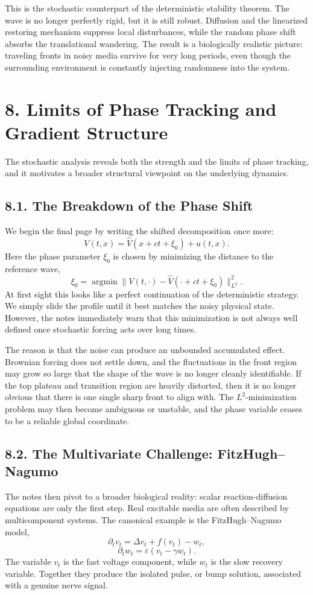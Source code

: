 \documentclass[11pt]{article}
\theoremstyle{definition}
\theoremstyle{remark}
\begin{document}
This is the stochastic counterpart of the deterministic stability theorem. The wave is no longer perfectly rigid, but it is still robust. Diffusion and the linearized restoring mechanism suppress local disturbances, while the random phase shift absorbs the translational wandering. The result is a biologically realistic picture: traveling fronts in noisy media survive for very long periods, even though the surrounding environment is constantly injecting randomness into the system.

\section*{8. Limits of Phase Tracking and Gradient Structure}
The stochastic analysis reveals both the strength and the limits of phase tracking, and it motivates a broader structural viewpoint on the underlying dynamics.

\subsection*{8.1. The Breakdown of the Phase Shift}
We begin the final page by writing the shifted decomposition once more:
\[
V(t,x)=\widehat V(x+ct+\xi_0)+u(t,x).
\]
Here the phase parameter \(\xi_0\) is chosen by minimizing the distance to the reference wave,
\[
\xi_0=\operatorname*{argmin}\|V(t,\cdot)-\widehat V(\cdot+ct+\xi_0)\|_{L^2}^2.
\]
At first sight this looks like a perfect continuation of the deterministic strategy. We simply slide the profile until it best matches the noisy physical state. However, the notes immediately warn that this minimization is not always well defined once stochastic forcing acts over long times.

The reason is that the noise can produce an unbounded accumulated effect. Brownian forcing does not settle down, and the fluctuations in the front region may grow so large that the shape of the wave is no longer cleanly identifiable. If the top plateau and transition region are heavily distorted, then it is no longer obvious that there is one single sharp front to align with. The \(L^2\)-minimization problem may then become ambiguous or unstable, and the phase variable ceases to be a reliable global coordinate.

\subsection*{8.2. The Multivariate Challenge: FitzHugh--Nagumo}
The notes then pivot to a broader biological reality: scalar reaction-diffusion equations are only the first step. Real excitable media are often described by multicomponent systems. The canonical example is the FitzHugh--Nagumo model,
\[
\partial_t v_t=\Delta v_t+f(v_t)-w_t,
\]
\[
\partial_t w_t=\varepsilon(v_t-\gamma w_t).
\]
The variable \(v_t\) is the fast voltage component, while \(w_t\) is the slow recovery variable. Together they produce the isolated pulse, or bump solution, associated with a genuine nerve signal.
\end{document}
